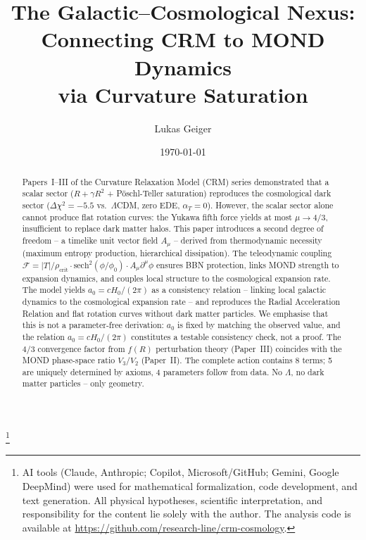 \documentclass[aps,prd,twocolumn,superscriptaddress,nofootinbib]{revtex4-2}
\begin{document}

\title{The Galactic--Cosmological Nexus: Connecting CRM to MOND Dynamics\\via Curvature Saturation}

\author{Lukas Geiger}

\date{\today}

\begin{abstract}
Papers~I--III of the Curvature Relaxation Model (CRM) series demonstrated that a scalar sector ($R + \gamma R^2$ + P\"oschl-Teller saturation) reproduces the cosmological dark sector ($\Delta\chi^2 = -5.5$ vs.\ $\Lambda$CDM, zero EDE, $\alpha_T = 0$). However, the scalar sector alone cannot produce flat rotation curves: the Yukawa fifth force yields at most $\mu \to 4/3$, insufficient to replace dark matter halos. This paper introduces a second degree of freedom -- a timelike unit vector field $A_\mu$ -- derived from thermodynamic necessity (maximum entropy production, hierarchical dissipation). The teleodynamic coupling $\mathcal{F} = |T|/\rho_{\mathrm{crit}} \cdot \mathrm{sech}^2(\phi/\phi_0) \cdot A_\mu\partial^\mu\phi$ ensures BBN protection, links MOND strength to expansion dynamics, and couples local structure to the cosmological expansion rate. The model yields $a_0 = cH_0/(2\pi)$ as a consistency relation -- linking local galactic dynamics to the cosmological expansion rate -- and reproduces the Radial Acceleration Relation and flat rotation curves without dark matter particles. We emphasise that this is not a parameter-free derivation: $a_0$ is fixed by matching the observed value, and the relation $a_0 = cH_0/(2\pi)$ constitutes a testable consistency check, not a proof. The $4/3$ convergence factor from $f(R)$ perturbation theory (Paper~III) coincides with the MOND phase-space ratio $V_3/V_2$ (Paper~II). The complete action contains 8 terms; 5 are uniquely determined by axioms, 4 parameters follow from data. No $\Lambda$, no dark matter particles -- only geometry.
\end{abstract}


\thanks{AI tools (Claude, Anthropic; Copilot, Microsoft/GitHub; Gemini, Google DeepMind) were used for mathematical formalization, code development, and text generation. All physical hypotheses, scientific interpretation, and responsibility for the content lie solely with the author. The analysis code is available at \url{https://github.com/research-line/crm-cosmology}.}
\end{document}
